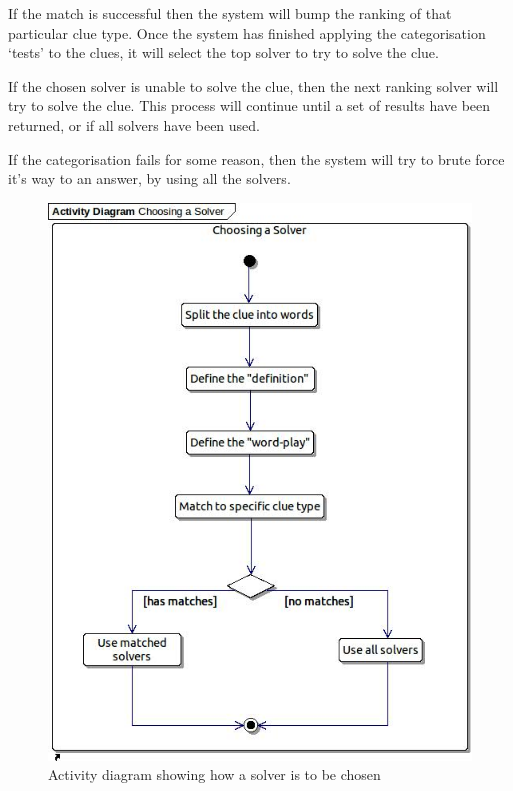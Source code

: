 If the match is successful then the system will bump the ranking of that 
particular clue type. Once the system has finished applying the categorisation 
`tests' to the clues, it will select the top solver to try to solve the clue.

If the chosen solver is unable to solve the clue, then the next ranking solver 
will try to solve the clue. This process will continue until a set of results 
have been returned, or if all solvers have been used.

If the categorisation fails for some reason, then the system will try to brute 
force it's way to an answer, by using all the solvers.

\begin{figure}[H]
  \centering
  \includegraphics[scale=0.6]{activity/choosing_a_solver.jpg}
  \caption{Activity diagram showing how a solver is to be chosen}
  \label{fig:categorisation_activity}
\end{figure}



